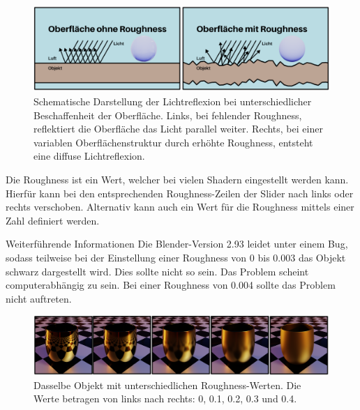 \documentclass[
]{book}
\let\oldmarginnote\marginnote
\renewcommand{\marginnote}[1]{%
  \oldmarginnote{{\footnotesize\selectfont #1}}%
}
\begin{document}
\begin{figure}

\includegraphics{Chapters/Images/Chapter_19/19_4_Roughness_Representation.png}

\caption{\label{fig-1_4}Schematische Darstellung der Lichtreflexion bei
unterschiedlicher Beschaffenheit der Oberfläche. Links, bei fehlender
Roughness, reflektiert die Oberfläche das Licht parallel weiter. Rechts,
bei einer variablen Oberflächenstruktur durch erhöhte Roughness,
entsteht eine diffuse Lichtreflexion.}

\end{figure}%

\marginnote{Roughness einstellen}

Die Roughness ist ein Wert, welcher bei vielen Shadern eingestellt
werden kann. Hierfür kann bei den entsprechenden Roughness-Zeilen der
Slider nach links oder rechts verschoben. Alternativ kann auch ein Wert
für die Roughness mittels einer Zahl definiert werden.

\begin{tipp}{Weiterführende Informationen}
Die Blender-Version 2.93 leidet unter einem Bug, sodass teilweise bei der Einstellung einer Roughness von 0 bis 0.003 das Objekt schwarz dargestellt wird. Dies sollte nicht so sein. Das Problem scheint computerabhängig zu sein. Bei einer Roughness von 0.004 sollte das Problem nicht auftreten.
\end{tipp}

\begin{figure}

\includegraphics{Chapters/Images/Chapter_19/19_5_Roughness_Spectrum_Comparison.png}

\caption{\label{fig-1_5}Dasselbe Objekt mit unterschiedlichen
Roughness-Werten. Die Werte betragen von links nach rechts: 0, 0.1, 0.2,
0.3 und 0.4.}

\end{figure}%
\end{document}
